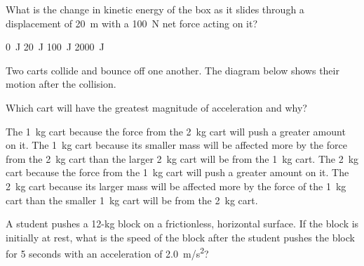 \documentclass[]{exam}
\begin{document}
\begin{questions}
What is the change in kinetic energy of the box as it slides through a displacement of \SI{20}{m} with a \SI{100}{N} net force acting on it?

\begin{randomizechoices}
    \choice \SI{0}{J}
    \choice \SI{20}{J}
    \choice \SI{100}{J}
    \correctchoice \SI{2000}{J}
\end{randomizechoices}


\clearpage

\question
Two carts collide and bounce off one another. The diagram below shows their motion after the collision.


\begin{center}
\end{center}

Which cart will have the greatest magnitude of acceleration and why?

\begin{randomizechoices}
    \choice The \SI{1}{kg} cart because the force from the \SI{2}{kg} cart will push a greater amount on it.	
    \correctchoice The \SI{1}{kg} cart because its smaller mass will be affected more by the force from the \SI{2}{kg} cart than the larger \SI{2}{kg} cart will be from the \SI{1}{kg} cart.	
    \choice The \SI{2}{kg} cart because the force from the \SI{1}{kg} cart will push a greater amount on it.
    \choice The \SI{2}{kg} cart because its larger mass will be affected more by the force of the \SI{1}{kg} cart than the smaller \SI{1}{kg} cart will be from the \SI{2}{kg} cart.    
\end{randomizechoices}

\question
A student pushes a 12-kg block on a frictionless, horizontal surface. If the block is initially at rest, what is the speed of the block after the student pushes the block for 5 seconds with an acceleration of \SI{2.0}{m/s^2}?


\end{questions}
\end{document}
